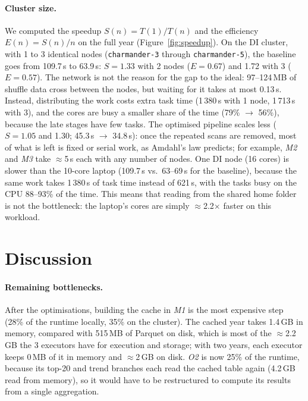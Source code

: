 \documentclass[10pt,a4paper]{article}
\begin{document}
\paragraph{Cluster size.} We computed the speedup $S(n)=T(1)/T(n)$ and the efficiency $E(n)=S(n)/n$ on the full year (Figure~\ref{fig:speedup}). On the DI cluster, with 1 to 3 identical nodes (\texttt{charmander-3} through \texttt{charmander-5}), the baseline goes from 109.7\,s to 63.9\,s: $S=1.33$ with 2 nodes ($E=0.67$) and 1.72 with 3 ($E=0.57$). The network is not the reason for the gap to the ideal: 97--124\,MB of shuffle data cross between the nodes, but waiting for it takes at most 0.13\,s. Instead, distributing the work costs extra task time (1\,380\,s with 1 node, 1\,713\,s with 3), and the cores are busy a smaller share of the time (79\% $\rightarrow$ 56\%), because the late stages have few tasks. The optimised pipeline scales less ($S=1.05$ and 1.30; 45.3\,s $\rightarrow$ 34.8\,s): once the repeated scans are removed, most of what is left is fixed or serial work, as Amdahl's law predicts; for example, \textit{M2} and \textit{M3} take $\approx$5\,s each with any number of nodes. One DI node (16 cores) is slower than the 10-core laptop (109.7\,s vs.\ 63--69\,s for the baseline), because the same work takes 1\,380\,s of task time instead of 621\,s, with the tasks busy on the CPU 88--93\% of the time. This means that reading from the shared home folder is not the bottleneck: the laptop's cores are simply $\approx$2.2$\times$ faster on this workload.

\section{Discussion}

\paragraph{Remaining bottlenecks.} After the optimisations, building the cache in \textit{M1} is the most expensive step (28\% of the runtime locally, 35\% on the cluster). The cached year takes 1.4\,GB in memory, compared with 515\,MB of Parquet on disk, which is most of the $\approx$2.2\,GB the 3 executors have for execution and storage; with two years, each executor keeps 0\,MB of it in memory and $\approx$2\,GB on disk. \textit{O2} is now 25\% of the runtime, because its top-20 and trend branches each read the cached table again (4.2\,GB read from memory), so it would have to be restructured to compute its results from a single aggregation.
\end{document}
